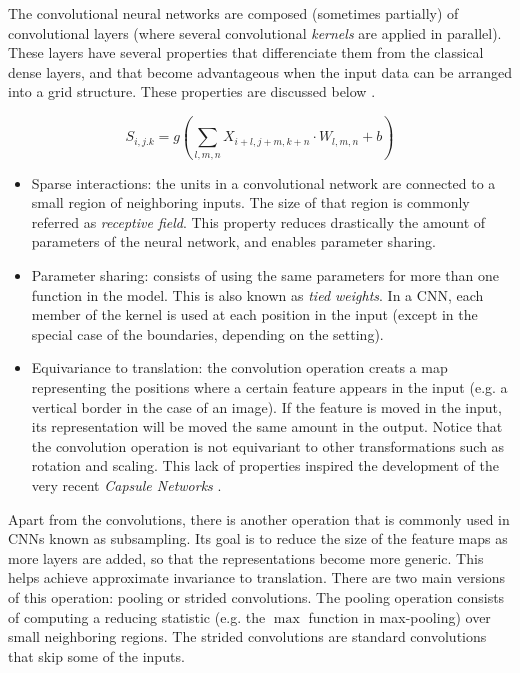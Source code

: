 The convolutional neural networks are composed (sometimes partially) of convolutional layers (where several convolutional \textit{kernels} are applied in parallel). These layers have several properties that differenciate them from the classical dense layers, and that become advantageous when the input data can be arranged into a grid structure. These properties are discussed below \autocite{Goodfellow2016}.

\begin{equation}
\label{eq:cnnformula}
S_{i,j.k} = g\left(\sum_{l,m,n}{X_{i+l, j+m, k+n} \cdot W_{l,m,n} + b}\right)
\end{equation}

\begin{itemize}
	\item Sparse interactions: the units in a convolutional network are connected to a small region of neighboring inputs. The size of that region is commonly referred as \textit{receptive field}. This property reduces drastically the amount of parameters of the neural network, and enables parameter sharing.
	\item Parameter sharing: consists of using the same parameters for more than one function in the model. This is also known as \textit{tied weights}. In a CNN, each member of the kernel is used at each position in the input (except in the special case of the boundaries, depending on the setting).
	\item Equivariance to translation: the convolution operation creats a map representing the positions where a certain feature appears in the input (e.g. a vertical border in the case of an image). If the feature is moved in the input, its representation will be moved the same amount in the output. Notice that the convolution operation is not equivariant to other transformations such as rotation and scaling. This lack of properties inspired the development of the very recent \textit{Capsule Networks} \autocite{sabour2017}.
\end{itemize}

Apart from the convolutions, there is another operation that is commonly used in CNNs known as subsampling. Its goal is to reduce the size of the feature maps as more layers are added, so that the representations become more generic. This helps achieve approximate invariance to translation. There are two main versions of this operation: pooling or strided convolutions. The pooling operation \autocite{Goodfellow2016} consists of computing a reducing statistic (e.g. the $\max$ function in max-pooling) over small neighboring regions. The strided convolutions \autocite{riadh2020} are standard convolutions that skip some of the inputs.

